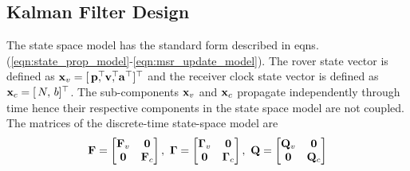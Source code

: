 \subsection{Kalman Filter Design}
The state space model has the standard form described in eqns. (\ref{eqn:state_prop_model}-\ref{eqn:msr_update_model}). 
The rover state vector is defined as
$\Boldx_v = [\,\Boldp^\top \!\!\!\!,  \, \Boldv^\top \!\!\!\!, \, \Bolda^\top]^\top$ 
and the receiver clock state vector is defined as $\mathbf{x}_c = [\,N, \, b]^\top$.
The sub-components $\mathbf{x}_v$ and $\mathbf{x}_c$ propagate independently through time hence their respective components in the state space model are not coupled.
The matrices of the discrete-time state-space model are
\begin{align}
	\mathbf{F} = \begin{bmatrix} \mathbf{F}_v & \boldsymbol{0} \\ \boldsymbol{0} & \mathbf{F}_c \end{bmatrix}, ~
	\boldsymbol{\Gamma} = \begin{bmatrix} \boldsymbol{\Gamma}_v & \boldsymbol{0} \\ \boldsymbol{0} & \boldsymbol{\Gamma}_c	\end{bmatrix}, ~
	\mathbf{Q} = \begin{bmatrix} \mathbf{Q}_v & \boldsymbol{0} \\ \boldsymbol{0} & \mathbf{Q}_c \end{bmatrix}
\end{align}

